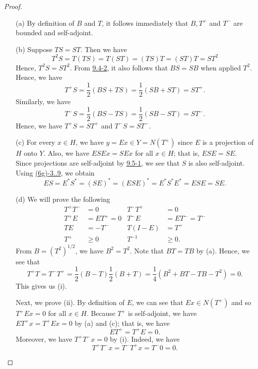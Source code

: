 \begin{proof}
\begin{enumerate}
    \item[(a)] By definition of \( B  \) and \( T  \), it follows immediately that \( B , T^{+} \) and \( T^{-} \) are bounded and self-adjoint. 
    \item[(b)] Suppose \( T S  = ST  \). Then we have 
        \[  T^{2} S = T (T S) = T (ST) = (TS)T = (ST)T = S T^{2}  \]
        Hence, \( T^{2} S = S T^{2} \). From {\hyperref[9.4-2]{9.4-2}}, it also follows that \( BS = SB \) when applied \( T^{2} \). Hence, we have 
        \[  T^{+}S = \frac{ 1 }{ 2 }  (BS  + TS) = \frac{ 1 }{ 2 }  (SB + ST) = S T^{+}.  \]
        Similarly, we have 
        \[  T^{-} S = \frac{ 1 }{ 2 } (BS - TS) = \frac{ 1 }{ 2 }  (SB - ST) = S T^{-}.  \]
        Hence, we have \( T^{+}S = S T^{+} \) and \( T^{-} S = S T^{-} \).
    \item[(c)] For every \( x \in H  \), we have \( y  = Ex \in Y = N(T^{+}) \) since \( E  \) is a projection of \( H  \) onto \( Y  \). Also, we have \( E S E x = SE x   \) for all \( x \in H  \); that is, \( ESE = SE \). Since projections are self-adjoint by {\hyperref[9.5-1]{9.5-1}}, we see that \( S  \) is also self-adjoint. Using {\hyperref[(6g)-3.9]{(6g)-3..9}}, we obtain   
        \[  ES = E^{*} S^{*} = (SE)^{*} = (ESE)^{*} = E^{*} S^{*} E^{*} = ESE = SE. \]
    \item[(d)] We will prove the following   
            \begin{align*}
                T^{+} T^{-} &= 0    &T^{-} T^{+} &= 0 \tag{i}   \\
                T^{+} E &= E T^{+ } = 0    &T^{-}E &= E T^{-} = T^{-} \tag{ii} \\
                TE  &= - T^{-}      &T(I  - E ) &= T^{+} \tag{iii} \\
                T^{+} &\geq 0    &T^{-1} &\geq 0. \tag{iv} 
            \end{align*}
            From \( B = (T^{2})^{1/2} \), we have \( B^{2} = T^{2} \). Note that \( BT = TB \) by (a). Hence, we see that 
            \[  T^{+}T = T^{-}T^{+} = \frac{ 1 }{ 2 } (B - T ) \frac{ 1 }{ 2 }  (B+T) = \frac{ 1 }{ 4 }  (B^{2} + BT - TB - T^{2}) = 0.  \]
            This gives us (i).

            Next, we prove (ii). By definition of \( E  \), we can see that \( Ex \in N (T^{+}) \) and so \( T^{+ } E x = 0  \) for all \( x \in  H \). Because \( T^{+ }  \) is self-adjoint, we have \( ET^{+} x = T^{+} E x = 0  \) by (a) and (c); that is, we have 
            \[  E T^{+} = T^{+}E = 0.  \]
            Moreover, we have \( T^{+} T^{-}x  = 0  \) by (i). Indeed, we have 
            \[  T^{+}T^{-}x = T^{-}T^{+}x = T^{-}0 = 0. \]


\end{enumerate}
\end{proof}
